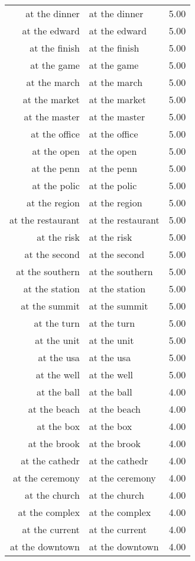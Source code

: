 \begin{table}[ht]
\begin{tabular}{rlr}
  at the dinner & at the dinner & 5.00 \\ 
  at the edward & at the edward & 5.00 \\ 
  at the finish & at the finish & 5.00 \\ 
  at the game & at the game & 5.00 \\ 
  at the march & at the march & 5.00 \\ 
  at the market & at the market & 5.00 \\ 
  at the master & at the master & 5.00 \\ 
  at the office & at the office & 5.00 \\ 
  at the open & at the open & 5.00 \\ 
  at the penn & at the penn & 5.00 \\ 
  at the polic & at the polic & 5.00 \\ 
  at the region & at the region & 5.00 \\ 
  at the restaurant & at the restaurant & 5.00 \\ 
  at the risk & at the risk & 5.00 \\ 
  at the second & at the second & 5.00 \\ 
  at the southern & at the southern & 5.00 \\ 
  at the station & at the station & 5.00 \\ 
  at the summit & at the summit & 5.00 \\ 
  at the turn & at the turn & 5.00 \\ 
  at the unit & at the unit & 5.00 \\ 
  at the usa & at the usa & 5.00 \\ 
  at the well & at the well & 5.00 \\ 
  at the ball & at the ball & 4.00 \\ 
  at the beach & at the beach & 4.00 \\ 
  at the box & at the box & 4.00 \\ 
  at the brook & at the brook & 4.00 \\ 
  at the cathedr & at the cathedr & 4.00 \\ 
  at the ceremony & at the ceremony & 4.00 \\ 
  at the church & at the church & 4.00 \\ 
  at the complex & at the complex & 4.00 \\ 
  at the current & at the current & 4.00 \\ 
  at the downtown & at the downtown & 4.00 \\ 

\end{tabular}
\end{table}
